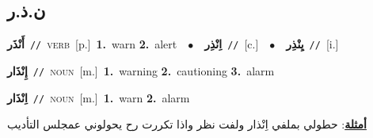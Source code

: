 \documentclass[10pt,a4paper,twoside]{article} %
\begin{document}
\begin{multicols}{2}
\vspace{-3mm}
\subsection*{\color{blue}\foreignlanguage{arabic}{ن.ذ.ر}\color{blue}{}} 

{\setlength\topsep{0pt}\textbf{\foreignlanguage{arabic}{أَنْذَر}}\ {\color{gray}\texttt{//}\color{black}}\ \textsc{verb}\ [p.]\ \textbf{1.}~warn  \textbf{2.}~alert\ \ $\bullet$\ \ \setlength\topsep{0pt}\textbf{\foreignlanguage{arabic}{اِنْذِر}}\ {\color{gray}\texttt{//}\color{black}}\ [c.]\ \ $\bullet$\ \ \setlength\topsep{0pt}\textbf{\foreignlanguage{arabic}{يِنْذِر}}\ {\color{gray}\texttt{//}\color{black}}\ [i.]\ } \vspace{2mm}

{\setlength\topsep{0pt}\textbf{\foreignlanguage{arabic}{إِنْذَار}}\ {\color{gray}\texttt{//}\color{black}}\ \textsc{noun}\ [m.]\ \textbf{1.}~warning  \textbf{2.}~cautioning  \textbf{3.}~alarm\ } \vspace{2mm}

{\setlength\topsep{0pt}\textbf{\foreignlanguage{arabic}{اِنْذَار}}\ {\color{gray}\texttt{//}\color{black}}\ \textsc{noun}\ [m.]\ \textbf{1.}~warn  \textbf{2.}~alarm\  \begin{flushright}\color{gray}\foreignlanguage{arabic}{\textbf{\underline{\foreignlanguage{arabic}{أمثلة}}}: حطولي بملفي اِنْذار ولفت نظر واذا تكررت رح يحولوني عمجلس التأديب}\end{flushright}\color{black}} \vspace{2mm}


\end{multicols}
\end{document}
